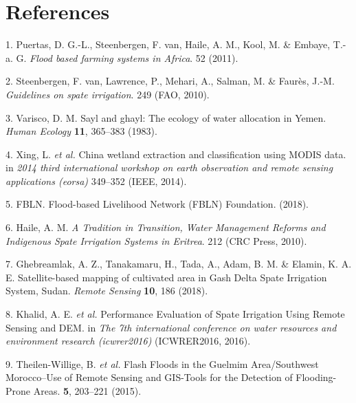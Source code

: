\documentclass[12pt,oneside]{article}
\begin{document}
\hypertarget{references}{%
\section*{References}\label{references}}

\hypertarget{refs}{}
\leavevmode\hypertarget{ref-Puertas_et_al_2011}{}%
1. Puertas, D. G.-L., Steenbergen, F. van, Haile, A. M., Kool, M. \&
Embaye, T.-a. G. \emph{Flood based farming systems in Africa}. 52
(2011).

\leavevmode\hypertarget{ref-VanSteenbergen_et_al_2010}{}%
2. Steenbergen, F. van, Lawrence, P., Mehari, A., Salman, M. \& Faurès,
J.-M. \emph{Guidelines on spate irrigation}. 249 (FAO, 2010).

\leavevmode\hypertarget{ref-Varisco_1983}{}%
3. Varisco, D. M. Sayl and ghayl: The ecology of water allocation in
Yemen. \emph{Human Ecology} \textbf{11}, 365--383 (1983).

\leavevmode\hypertarget{ref-Xing_et_al_2014}{}%
4. Xing, L. \emph{et al.} China wetland extraction and classification
using MODIS data. in \emph{2014 third international workshop on earth
observation and remote sensing applications (eorsa)} 349--352 (IEEE,
2014).

\leavevmode\hypertarget{ref-FBLN_2018}{}%
5. FBLN. Flood-based Livelihood Network (FBLN) Foundation. (2018).

\leavevmode\hypertarget{ref-Haile_2010}{}%
6. Haile, A. M. \emph{A Tradition in Transition, Water Management
Reforms and Indigenous Spate Irrigation Systems in Eritrea}. 212 (CRC
Press, 2010).

\leavevmode\hypertarget{ref-Ghebreamlak_et_al_2018}{}%
7. Ghebreamlak, A. Z., Tanakamaru, H., Tada, A., Adam, B. M. \& Elamin,
K. A. E. Satellite-based mapping of cultivated area in Gash Delta Spate
Irrigation System, Sudan. \emph{Remote Sensing} \textbf{10}, 186 (2018).

\leavevmode\hypertarget{ref-Khalid_et_al_2016}{}%
8. Khalid, A. E. \emph{et al.} Performance Evaluation of Spate
Irrigation Using Remote Sensing and DEM. in \emph{The 7th international
conference on water resources and environment research (icwrer2016)}
(ICWRER2016, 2016).

\leavevmode\hypertarget{ref-Theilen-Willige_et_al_2015}{}%
9. Theilen-Willige, B. \emph{et al.} Flash Floods in the Guelmim
Area/Southwest Morocco--Use of Remote Sensing and GIS-Tools for the
Detection of Flooding-Prone Areas. \textbf{5}, 203--221 (2015).
\end{document}
